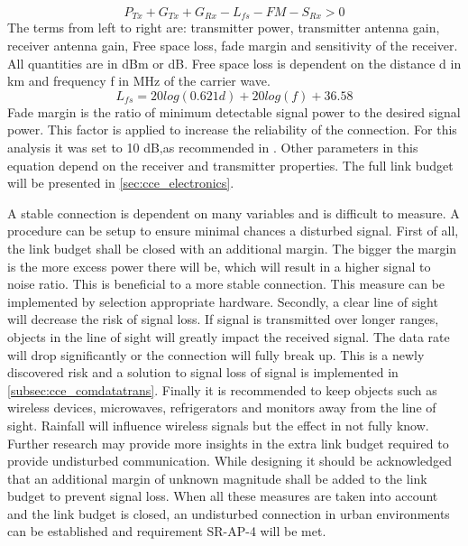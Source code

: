 \begin{equation}
    P_{Tx} + G_{Tx} + G_{Rx} - L_{fs} - FM - S_{Rx} > 0
\end{equation}
The terms from left to right are: transmitter power, transmitter antenna gain, receiver antenna gain, Free space loss, fade margin and sensitivity of the receiver. All quantities are in dBm or dB. Free space loss is dependent on the distance d in km and frequency f in MHz of the carrier wave. 
\begin{equation}
    L_{fs} = 20 log(0.621d) + 20 log(f) + 36.58
\end{equation}
Fade margin is the ratio of minimum detectable signal power to the desired signal power. This factor is applied to increase the reliability of the connection. For this analysis it was set to 10 dB,as recommended in \cite{link_budget}. Other parameters in this equation depend on the receiver and transmitter properties. The full link budget will be presented in \autoref{sec:cce_electronics}.


A stable connection is dependent on many variables and is difficult to measure. A procedure can be setup to ensure minimal chances a disturbed signal. First of all, the link budget shall be closed with an additional margin. The bigger the margin is the more excess power there will be, which will result in a higher signal to noise ratio. This is beneficial to a more stable connection. This measure can be implemented by selection appropriate hardware. Secondly, a clear line of sight will decrease the risk of signal loss. If signal is transmitted over longer ranges, objects in the line of sight will greatly impact the received signal. The data rate will drop significantly or the connection will fully break up. This is a newly discovered risk and a solution to signal loss of signal is implemented in \autoref{subsec:cce_comdatatrans}. Finally it is recommended to keep objects such as wireless devices, microwaves, refrigerators and monitors away from the line of sight\cite{wifiinterference}. Rainfall will influence wireless signals but the effect in not fully know. Further research may provide more insights in the extra link budget required to provide undisturbed communication. While designing it should be acknowledged that an additional margin of unknown magnitude shall be added to the link budget to prevent signal loss. When all these measures are taken into account and the link budget is closed, an undisturbed connection in urban environments can be established and requirement SR-AP-4 will be met.



